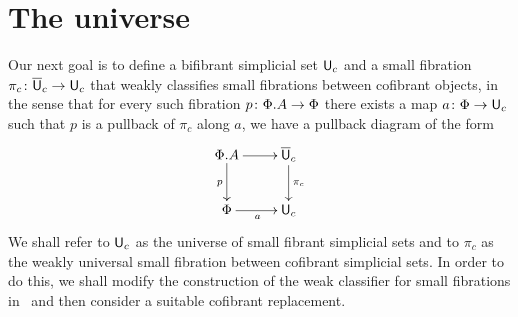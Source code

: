 \documentclass[reqno,10pt,a4paper,oneside,draft]{amsart}
\begin{document}




\newpage

\section{The universe}

Our next goal is to define a bifibrant simplicial set $\mathsf{U}_c$ and a small fibration $\pi_c \colon \overline{\mathsf{U}}_c \to \mathsf{U}_c$ that weakly classifies small fibrations between cofibrant objects, in the sense that for every such fibration $p \colon \Phi.A \to \Phi$ there exists a map $a \colon \Phi \to \mathsf{U}_c$ such that $p$ is a pullback of $\pi_c$ along $a$, \ie we have a pullback diagram of the form
\[
\xymatrix{
\Phi.A \ar[r] \ar[d]_p   & \UU_c \ar[d]^{\pi_c} \\
\Phi \ar[r]_a &  \U_c }
\]
We shall refer to $\mathsf{U}_c$ as the universe of small fibrant simplicial sets and to $\pi_c$ as the 
weakly universal small fibration between cofibrant simplicial sets.
In order to do this, we shall modify  the construction of the weak classifier for small fibrations 
in~\cite{voevodsky-simplicial-model} and then consider a suitable cofibrant replacement. 
\end{document}
